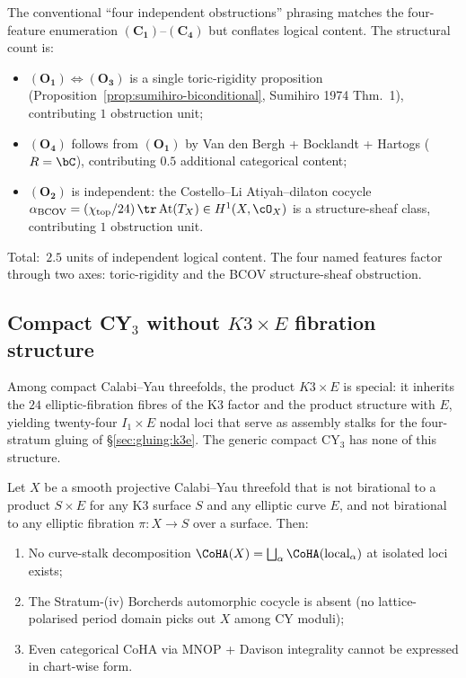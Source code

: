 \begin{remark}
\label{rem:two-and-a-half}
The conventional ``four independent obstructions'' phrasing matches the
four-feature enumeration $(\mathbf{C_1})$--$(\mathbf{C_4})$ but
conflates logical content. The structural count is:
\begin{itemize}[leftmargin=2em]
\item $(\mathbf{O_1}) \Leftrightarrow (\mathbf{O_3})$ is a single
 toric-rigidity proposition (Proposition~\ref{prop:sumihiro-biconditional},
 Sumihiro 1974 Thm.~1), contributing $1$ obstruction unit;
\item $(\mathbf{O_4})$ follows from $(\mathbf{O_1})$ by Van den Bergh
 + Bocklandt + Hartogs ($R = \bC$), contributing $0.5$ additional
 categorical content;
\item $(\mathbf{O_2})$ is independent: the Costello--Li
 Atiyah--dilaton cocycle
 $\alpha_{\mathrm{BCOV}}=(\chi_{\mathrm{top}}/24)\,\tr\,\mathrm{At}(T_X)
 \in H^1(X,\cO_X)$ is a structure-sheaf class, contributing $1$
 obstruction unit.
\end{itemize}
Total:\ $2.5$ units of independent logical content. The four named
features factor through two axes: toric-rigidity and the BCOV
structure-sheaf obstruction.
\end{remark}
\subsection{Compact CY$_3$ without $K3 \times E$ fibration structure}
\label{sec:compact-no-fibration}

Among compact Calabi--Yau threefolds, the product $K3 \times E$ is
special: it inherits the $24$ elliptic-fibration fibres of the K3 factor
and the product structure with $E$, yielding twenty-four
$I_1 \times E$ nodal loci that serve as assembly stalks for the
four-stratum gluing of \S\ref{sec:gluing:k3e}. The generic compact CY$_3$ has none
of this structure.

\begin{proposition}
\label{prop:no-fibration-assembly}
Let $X$ be a smooth projective Calabi--Yau threefold that is not
birational to a product $S \times E$ for any K3 surface $S$ and any
elliptic curve $E$, and not birational to any elliptic fibration
$\pi: X \to S$ over a surface. Then:
\begin{enumerate}[leftmargin=2em]
\item No curve-stalk decomposition $\CoHA(X) = \bigsqcup_\alpha
 \CoHA(\text{local}_\alpha)$ at isolated loci exists;
\item The Stratum-(iv) Borcherds automorphic cocycle is absent (no
 lattice-polarised period domain picks out $X$ among CY moduli);
\item Even categorical CoHA via MNOP + Davison integrality cannot be
 expressed in chart-wise form.
\end{enumerate}
\end{proposition}

